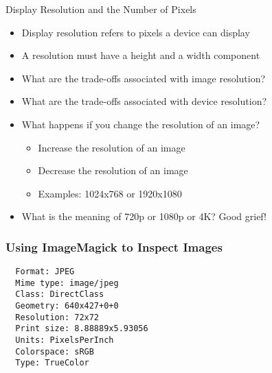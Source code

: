 \documentclass[14pt,aspectratio=169]{beamer}
\begin{document}
%
\begin{frame}{Display Resolution and the Number of Pixels}
  \begin{itemize}
    \item Display resolution refers to pixels a device can display
      \vspace*{-.2in}
    \item A resolution must have a height and a width component
      \vspace*{-.2in}
    \item What are the trade-offs associated with image resolution?
      \vspace*{-.2in}
    \item What are the trade-offs associated with device resolution?
      \vspace*{-.2in}
    \item What happens if you change the resolution of an image?
      \begin{itemize}
        \item Increase the resolution of an image
        \item Decrease the resolution of an image
        \item Examples: 1024x768 or 1920x1080
      \end{itemize}
      \vspace*{-.2in}
    \item What is the meaning of 720p or 1080p or 4K? Good grief!
  \end{itemize}
\end{frame}

%
\begin{frame}[fragile]
  \frametitle{Using ImageMagick to Inspect Images}
  \normalsize
  \begin{minipage}{6in}
    \vspace*{.1in}
    \begin{verbatim}
  Format: JPEG
  Mime type: image/jpeg
  Class: DirectClass
  Geometry: 640x427+0+0
  Resolution: 72x72
  Print size: 8.88889x5.93056
  Units: PixelsPerInch
  Colorspace: sRGB
  Type: TrueColor
    \end{verbatim}
  \end{minipage}
\end{frame}
\end{document}
